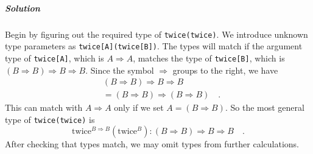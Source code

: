 \subparagraph{Solution}

Begin by figuring out the required type of \lstinline!twice(twice)!.
We introduce unknown type parameters as \lstinline!twice[A](twice[B])!.
The types will match if the argument type of \lstinline!twice[A]!,
which is $A\Rightarrow A$, matches the type of \lstinline!twice[B]!,
which is $\left(B\Rightarrow B\right)\Rightarrow B\Rightarrow B$.
Since the symbol $\Rightarrow$ groups to the right, we have 
\begin{align*}
 & \left(B\Rightarrow B\right)\Rightarrow B\Rightarrow B\\
 & =\left(B\Rightarrow B\right)\Rightarrow\left(B\Rightarrow B\right)\quad.
\end{align*}
This can match with $A\Rightarrow A$ only if we set $A=\left(B\Rightarrow B\right)$.
So the most general type of \lstinline!twice(twice)! is
\begin{equation}
\text{twice}^{B\Rightarrow B}(\text{twice}^{B}):\left(B\Rightarrow B\right)\Rightarrow B\Rightarrow B\quad.\label{eq:hof-twice-example-solved3}
\end{equation}
After checking that types match, we may omit types from further calculations.

